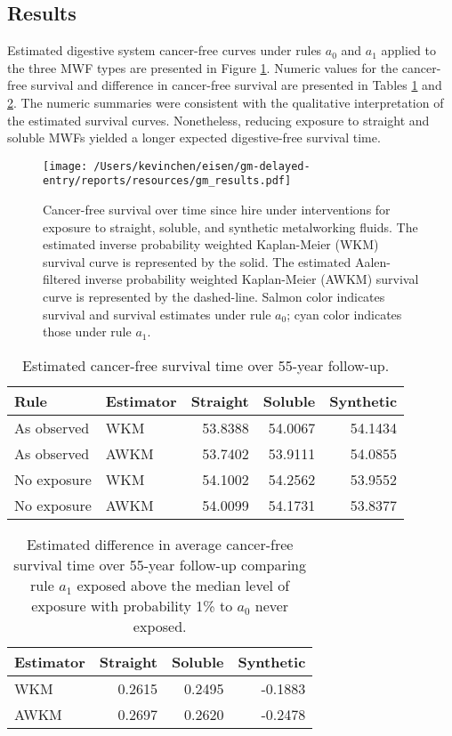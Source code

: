 \documentclass[
  11pt,
]{article}
\begin{document}
\hypertarget{results-1}{%
\subsection{Results}\label{results-1}}

Estimated digestive system cancer-free curves under rules \(a_0\) and
\(a_1\) applied to the three MWF types are presented in Figure
\ref{fig:gm_survival}. Numeric values for the cancer-free survival and
difference in cancer-free survival are presented in Tables
\ref{tab:gm_survival} and \ref{tab:gm_differences}. The numeric
summaries were consistent with the qualitative interpretation of the
estimated survival curves. Nonetheless, reducing exposure to straight
and soluble MWFs yielded a longer expected digestive-free survival time.

\begin{figure}[h]
\caption{Cancer-free survival over time since hire under interventions for exposure to straight, soluble, and synthetic metalworking fluids. The estimated inverse probability weighted Kaplan-Meier (WKM) survival curve is represented by the solid. The estimated Aalen-filtered inverse probability weighted Kaplan-Meier (AWKM) survival curve is represented by the dashed-line. Salmon color indicates survival and survival estimates under rule $a_0$; cyan color indicates those under rule $a_1$.}
\label{fig:gm_survival}
\begin{center}
\texttt{[image: /Users/kevinchen/eisen/gm-delayed-entry/reports/resources/gm\_results.pdf]}
\end{center}
\end{figure}

\begin{table}[H]
\centering
\caption{Estimated cancer-free survival time over 55-year follow-up.} 
\label{tab:gm_survival}
\begin{tabular}{llrrr}
  \toprule
Rule & Estimator & Straight & Soluble & Synthetic \\ 
  \midrule
As observed & WKM & 53.8388 & 54.0067 & 54.1434 \\ 
  As observed & AWKM & 53.7402 & 53.9111 & 54.0855 \\ 
   \midrule
No exposure & WKM & 54.1002 & 54.2562 & 53.9552 \\ 
  No exposure & AWKM & 54.0099 & 54.1731 & 53.8377 \\ 
   \bottomrule
\end{tabular}
\end{table}
\begin{table}[H]
\centering
\caption{Estimated difference in average cancer-free survival time over 55-year follow-up comparing rule $a_1$ exposed above the median level of exposure with probability 1\% to $a_0$ never exposed.} 
\label{tab:gm_differences}
\begin{tabular}{lrrr}
  \toprule
Estimator & Straight & Soluble & Synthetic \\ 
  \midrule
WKM & 0.2615 & 0.2495 & -0.1883 \\ 
  AWKM & 0.2697 & 0.2620 & -0.2478 \\ 
   \bottomrule
\end{tabular}
\end{table}
\end{document}
